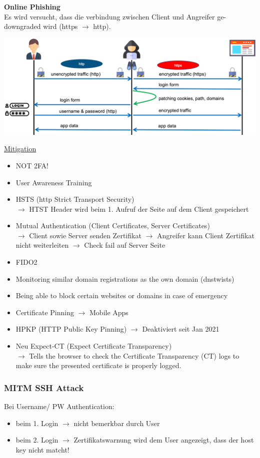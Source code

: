 \textbf{Online Phishing}\\
Es wird versucht, dass die verbindung zwischen Client und Angreifer ge-downgraded wird (https $\rightarrow$ http).
\begin{center}
    \vspace{-8pt}
    \includegraphics[width=.8\linewidth]{./img/09-mitm/http2https}
    \vspace{-8pt}
\end{center}
\underline{Mitigation}
\begin{itemize}
    \item NOT 2FA!
    \item User Awareness Training
    \item HSTS (http Strict Transport Security)\\
    $\rightarrow$ HTST Header wird beim 1. Aufruf der Seite auf dem Client gespeichert
    \item Mutual Authentication (Client Certificates, Server Certificates) \\
    $\rightarrow$ Client sowie Server senden Zertifikat $\rightarrow$ Angreifer kann Client Zertifikat nicht weiterleiten $\rightarrow$ Check fail auf Server Seite
    \item FIDO2
    \item Monitoring similar domain registrations as the own domain (dnstwists)
    \item Being able to block certain websites or domains in case of emergency
    \item Certificate Pinning $\rightarrow$ Mobile Apps
    \item HPKP (HTTP Public Key Pinning) $\rightarrow$ Deaktiviert seit Jan 2021
    \item Neu Expect-CT (Expect Certificate Transparency)\\
    $\rightarrow$ Tells the browser to check the Certificate Transparency (CT) logs to make sure the presented certificate is properly logged.
\end{itemize}

\subsubsection{MITM SSH Attack}
Bei Username/ PW Authentication:
\begin{itemize}
    \item beim 1. Login $\rightarrow$ nicht bemerkbar durch User
    \item beim 2. Login $\rightarrow$ Zertifikatswarnung wird dem User angezeigt, dass der host key nicht matcht!
\end{itemize}

